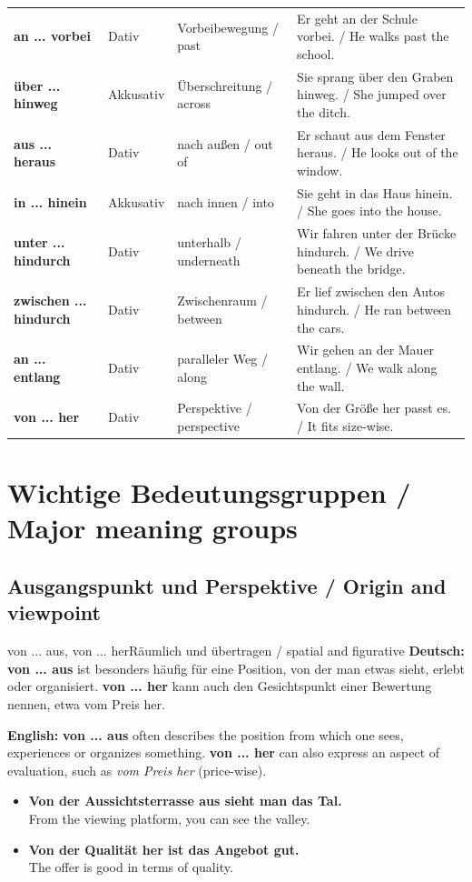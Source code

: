\documentclass[a4paper,11pt]{article}
\newcommand{\GermanText}[1]{\textbf{Deutsch: }#1\par}
\newcommand{\EnglishText}[1]{{\small\color{SoftGray}\textbf{English: }#1\par}}
\newcommand{\ExampleItem}[2]{\item \textbf{#1}\\{\small\color{SoftGray}#2}}
\begin{document}
{\begin{longtable}{>{\bfseries}p{3.0cm}p{1.5cm}p{3.2cm}p{5.9cm}}
an ... vorbei & Dativ & Vorbeibewegung / past & Er geht an der Schule vorbei. / He walks past the school. \\
über ... hinweg & Akkusativ & Überschreitung / across & Sie sprang über den Graben hinweg. / She jumped over the ditch. \\
aus ... heraus & Dativ & nach außen / out of & Er schaut aus dem Fenster heraus. / He looks out of the window. \\
in ... hinein & Akkusativ & nach innen / into & Sie geht in das Haus hinein. / She goes into the house. \\
unter ... hindurch & Dativ & unterhalb / underneath & Wir fahren unter der Brücke hindurch. / We drive beneath the bridge. \\
zwischen ... hindurch & Dativ & Zwischenraum / between & Er lief zwischen den Autos hindurch. / He ran between the cars. \\
an ... entlang & Dativ & paralleler Weg / along & Wir gehen an der Mauer entlang. / We walk along the wall. \\
von ... her & Dativ & Perspektive / perspective & Von der Größe her passt es. / It fits size-wise. \\
\end{longtable}
}

\section{Wichtige Bedeutungsgruppen / Major meaning groups}
\subsection{Ausgangspunkt und Perspektive / Origin and viewpoint}
\begin{grammarentry}{von ... aus, von ... her}{Räumlich und übertragen / spatial and figurative}
\GermanText{\textbf{von ... aus} ist besonders häufig für eine Position, von der man etwas sieht, erlebt oder organisiert. \textbf{von ... her} kann auch den Gesichtspunkt einer Bewertung nennen, etwa \glqq vom Preis her\grqq.}
\EnglishText{\textbf{von ... aus} often describes the position from which one sees, experiences or organizes something. \textbf{von ... her} can also express an aspect of evaluation, such as \emph{vom Preis her} (price-wise).}
\end{grammarentry}
\begin{exbox}\begin{itemize}
\ExampleItem{Von der Aussichtsterrasse aus sieht man das Tal.}{From the viewing platform, you can see the valley.}
\ExampleItem{Von der Qualität her ist das Angebot gut.}{The offer is good in terms of quality.}
\end{itemize}\end{exbox}
\end{document}
